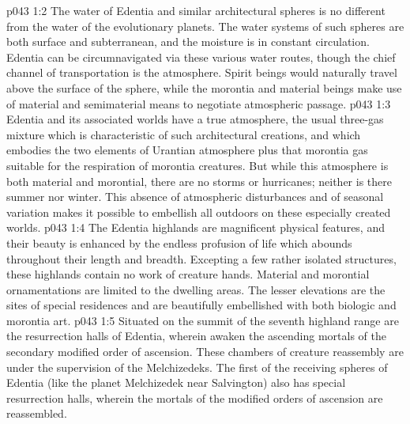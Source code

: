 \vs p043 1:2 The water of Edentia and similar architectural spheres is no different from the water of the evolutionary planets. The water systems of such spheres are both surface and subterranean, and the moisture is in constant circulation. Edentia can be circumnavigated via these various water routes, though the chief channel of transportation is the atmosphere. Spirit beings would naturally travel above the surface of the sphere, while the morontia and material beings make use of material and semimaterial means to negotiate atmospheric passage.
\vs p043 1:3 Edentia and its associated worlds have a true atmosphere, the usual three\hyp{}gas mixture which is characteristic of such architectural creations, and which embodies the two elements of Urantian atmosphere plus that morontia gas suitable for the respiration of morontia creatures. But while this atmosphere is both material and morontial, there are no storms or hurricanes; neither is there summer nor winter. This absence of atmospheric disturbances and of seasonal variation makes it possible to embellish all outdoors on these especially created worlds.
\vs p043 1:4 The Edentia highlands are magnificent physical features, and their beauty is enhanced by the endless profusion of life which abounds throughout their length and breadth. Excepting a few rather isolated structures, these highlands contain no work of creature hands. Material and morontial ornamentations are limited to the dwelling areas. The lesser elevations are the sites of special residences and are beautifully embellished with both biologic and morontia art.
\vs p043 1:5 \pc Situated on the summit of the seventh highland range are the resurrection halls of Edentia, wherein awaken the ascending mortals of the secondary modified order of ascension. These chambers of creature reassembly are under the supervision of the Melchizedeks. The first of the receiving spheres of Edentia (like the planet Melchizedek near Salvington) also has special resurrection halls, wherein the mortals of the modified orders of ascension are reassembled.
